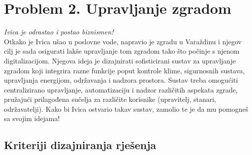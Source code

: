 \documentclass{article}
\begin{document}
\newpage

\section{Problem 2. Upravljanje zgradom}

\textit{Ivica je odrastao i postao biznismen!} \\
Otkako je Ivica ušao u poslovne vode, napravio je zgradu u Varaždinu i njegov cilj je sada osigurati lakše upravljanje tom zgradom tako što počinje s njenom digitalizacijom. Njegova ideja je dizajnirati sofisticirani sustav za upravljanje zgradom koji integrira razne funkcije poput kontrole klime, sigurnosnih sustava, upravljanja energijom, održavanja i nadzora prostora. Sustav treba omogućiti centralizirano upravljanje, automatizaciju i nadzor različitih aspekata zgrade, pružajući prilagođena sučelja za različite korisnike (upravitelj, stanari, održavatelji). Kako bi Ivica ostvario takav sustav, zamolio te je da mu pomogneš sa svojim idejama!

\subsection{Kriteriji dizajniranja rješenja}
\end{document}
